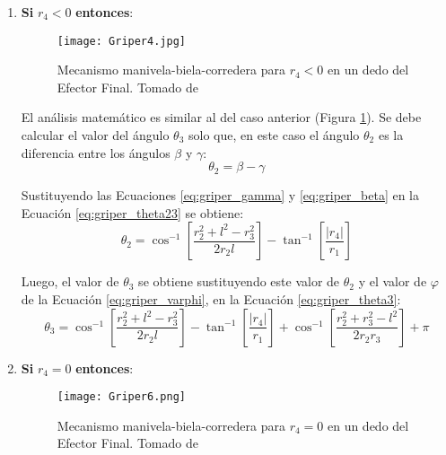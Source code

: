 \begin{enumerate}
\item \textbf{Si} $r_4<0$ \textbf{entonces}:
\begin{figure}[htb]
    \centering
     \texttt{[image: Griper4.jpg]}
    \caption [Mecanismo manivela-biela-corredera para $r_4<0$ en un dedo del Efector Final.]{Mecanismo manivela-biela-corredera para $r_4<0$ en un dedo del Efector Final. Tomado de \cite{zapata_zapata_control_2017} }
    \label{fig:Griper_MBC2}
\end{figure}

El análisis matemático es similar al del caso anterior (Figura \ref{fig:Griper_MBC2}). Se debe calcular el valor del ángulo $\theta_3$ solo que, en este caso el ángulo $\theta_2$ es la diferencia entre los ángulos $\beta$ y $\gamma$:
\begin{equation}\label{eq:griper_theta23}
\theta_2=\beta-\gamma
\end{equation}

Sustituyendo las Ecuaciones \ref{eq:griper_gamma} y \ref{eq:griper_beta} en la Ecuación \ref{eq:griper_theta23} se obtiene:
\begin{equation}\label{eq:griper_theta24}
\theta_2=  \cos^{-1}\left[  \frac{r^2_2 +l^2-r^2_3}{2r_2l}\right]- \tan^{-1}\left[  \frac{|r_4|}{r_1}\right]
\end{equation}

Luego, el valor de $\theta_3$ se obtiene sustituyendo este valor de $\theta_2$  y el valor de $\varphi$ de la Ecuación \ref{eq:griper_varphi},  en la Ecuación \ref{eq:griper_theta3}:
\begin{equation}\label{eq:griper_theta34}
\theta_3= \cos^{-1}\left[  \frac{r^2_2 +l^2-r^2_3}{2r_2l}\right]- \tan^{-1}\left[  \frac{|r_4|}{r_1}\right]+\cos^{-1}\left[ \frac{r^2_2 +r^2_3-l^2}{2r_2r_3}\right]+\pi
\end{equation}

\item \textbf{Si} $r_4=0$ \textbf{entonces}:
\begin{figure}[htb]
    \centering
     \texttt{[image: Griper6.png]}
    \caption[Mecanismo manivela-biela-corredera para $r_4 =0$ en un dedo del Efector Final.]{Mecanismo manivela-biela-corredera para $r_4 =0$ en un dedo del Efector Final. Tomado de \cite{zapata_zapata_control_2017} }
    \label{fig:Griper_MBC3}
\end{figure}


\end{enumerate}
